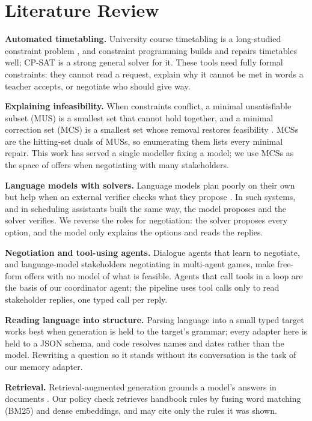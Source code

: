 \documentclass[11pt,a4paper]{article}
\begin{document}
\section{Literature Review}
\textbf{Automated timetabling.} University course timetabling is a long-studied constraint problem
\cite{burke2002}, and constraint programming builds and repairs timetables well; CP-SAT \cite{ortools} is a strong
general solver for it. These tools need fully formal constraints: they cannot read a request, explain why it cannot
be met in words a teacher accepts, or negotiate who should give way.

\textbf{Explaining infeasibility.} When constraints conflict, a minimal unsatisfiable subset (MUS) is a smallest set
that cannot hold together, and a minimal correction set (MCS) is a smallest set whose removal restores feasibility
\cite{liffiton2008}. MCSs are the hitting-set duals of MUSs, so enumerating them lists every minimal repair. This work
has served a single modeller fixing a model; we use MCSs as the space of offers when negotiating with many
stakeholders.

\textbf{Language models with solvers.} Language models plan poorly on their own but help when an external verifier
checks what they propose \cite{kambhampati2024}. In such systems, and in scheduling assistants built the same way,
the model proposes and the solver verifies. We reverse the roles for negotiation: the solver proposes every option,
and the model only explains the options and reads the replies.

\textbf{Negotiation and tool-using agents.} Dialogue agents that learn to negotiate, and language-model stakeholders
negotiating in multi-agent games, make free-form offers with no model of what is feasible. Agents that call tools in
a loop are the basis of our coordinator agent; the pipeline uses tool calls only to read stakeholder replies, one
typed call per reply.

\textbf{Reading language into structure.} Parsing language into a small typed target works best when generation is
held to the target's grammar; every adapter here is held to a JSON schema, and code resolves names and dates rather
than the model. Rewriting a question so it stands without its conversation is the task of our memory adapter.

\textbf{Retrieval.} Retrieval-augmented generation grounds a model's answers in documents \cite{lewis2020}. Our
policy check retrieves handbook rules by fusing word matching (BM25) and dense embeddings, and may cite only the rules
it was shown.
\end{document}
